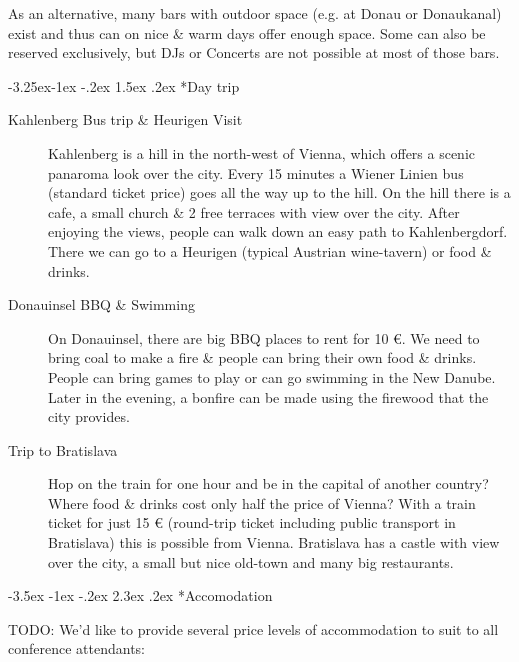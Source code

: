\documentclass[10pt,a4paper]{article}
\makeatletter
\renewcommand\section{%
\@startsection{section}{1}{\z@}%
              {-3.5ex \@plus -1ex \@minus -.2ex}%
              {2.3ex \@plus.2ex}%
              {\color{kdelight}\sffamily\LARGE\bfseries}}
\renewcommand\subsection{%
\@startsection{subsection}{2}{\z@}%
              {-3.25ex\@plus -1ex \@minus -.2ex}%
              {1.5ex \@plus .2ex}%
              {\color{kdelight}\sffamily\Large\bfseries}}
\makeatother
\begin{document}
As an alternative, many bars with outdoor space (e.g. at Donau or Donaukanal) exist and thus can on nice \& warm days offer enough space. Some can also be reserved exclusively, but DJs or Concerts are not possible at most of those bars.


\subsection*{Day trip}
\begin{description}
\item[\color{kdedarker} Kahlenberg Bus trip \& Heurigen Visit] Kahlenberg is a hill in the north-west of Vienna, which offers a scenic panaroma look over the city. Every 15 minutes a Wiener Linien bus (standard ticket price) goes all the way up to the hill. On the hill there is a cafe, a small church \& 2 free terraces with view over the city. After enjoying the views, people can walk down an easy path to Kahlenbergdorf. There we can go to a Heurigen (typical Austrian wine-tavern) or food \& drinks.
\item[\color{kdedarker} Donauinsel BBQ \& Swimming] On Donauinsel, there are big BBQ places to rent for 10 \euro{}. We need to bring coal to make a fire \& people can bring their own food \& drinks. People can bring games to play or can go swimming in the New Danube. Later in the evening, a bonfire can be made using the firewood that the city provides.
\item[\color{kdedarker} Trip to Bratislava] Hop on the train for one hour and be in the capital of another country? Where food \& drinks cost only half the price of Vienna? With a train ticket for just 15 \euro{} (round-trip ticket including public transport in Bratislava) this is possible from Vienna. Bratislava has a castle with view over the city, a small but nice old-town and many big restaurants.
\end{description}

\cleardoublepage

\section*{Accomodation}
TODO:
We'd like to provide several price levels of accommodation to suit to all conference attendants:
\end{document}

